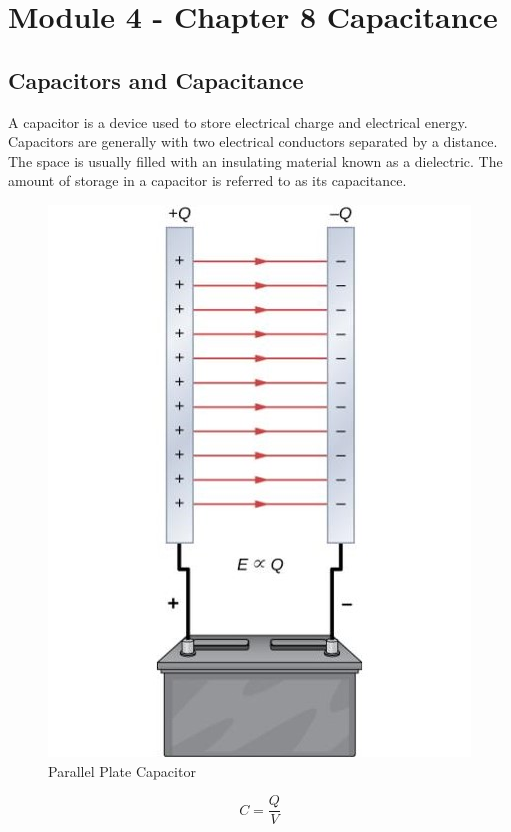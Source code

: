 \documentclass[14pt]{memoir}
\begin{document}
\chapter{Module 4 - Chapter 8 Capacitance}

\section{Capacitors and Capacitance}

A capacitor is a device used to store electrical charge and electrical energy. Capacitors are generally with two electrical conductors separated by a distance. The space is usually
filled with an insulating material known as a dielectric. The amount of storage in a capacitor is referred to as its capacitance. 

\begin{figure}[H]
\begin{center}
\includegraphics[scale=0.50]{fig/fig_08_03.jpg}
\caption{Parallel Plate Capacitor}
\label{fig:08_03}
\end{center}
\end{figure}



\begin{equation}
C = \frac{Q}{V}
\label{eq:cap}
\end{equation}
\end{document}
